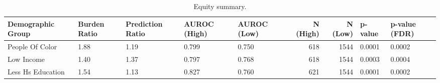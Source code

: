 \begin{table}
\caption{Equity summary.}
\label{tab:equity}
\begin{tabular}{lllllrrll}
\toprule
Demographic Group & Burden Ratio & Prediction Ratio & AUROC (High) & AUROC (Low) & N (High) & N (Low) & p-value & p-value (FDR) \\
\midrule
People Of Color & 1.88 & 1.19 & 0.799 & 0.750 & 618 & 1544 & 0.0001 & 0.0002 \\
Low Income & 1.40 & 1.37 & 0.797 & 0.768 & 618 & 1544 & 0.0003 & 0.0004 \\
Less Hs Education & 1.54 & 1.13 & 0.827 & 0.760 & 621 & 1544 & 0.0001 & 0.0002 \\
\bottomrule
\end{tabular}
\end{table}
